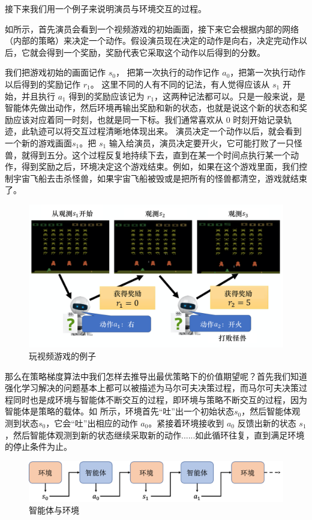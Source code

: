 接下来我们用一个例子来说明演员与环境交互的过程。

如所示，首先演员会看到一个视频游戏的初始画面，接下来它会根据内部的网络（内部的策略）来决定一个动作。假设演员现在决定的动作是向右，决定完动作以后，它就会得到一个奖励，奖励代表它采取这个动作以后得到的分数。

我们把游戏初始的画面记作 $s_0$， 把第一次执行的动作记作 $a_0$，把第一次执行动作以后得到的奖励记作 $r_1$。
这里不同的人有不同的记法，有人觉得应该从 $s_1$ 开始，并且执行 $a_1$ 得到的奖励应该记为 $r_1$，这两种记法都可以。只是一般来说，是智能体先做出动作，然后环境再输出奖励和新的状态，也就是说这个新的状态和奖励应该对应着同一时刻，也就是同一下标。我们通常喜欢从 0 时刻开始记录轨迹，此轨迹可以将交互过程清晰地体现出来。
演员决定一个动作以后，就会看到一个新的游戏画面$s_1$。把 $s_1$ 输入给演员，演员决定要开火，它可能打败了一只怪兽，就得到五分。这个过程反复地持续下去，直到在某一个时间点执行某一个动作，得到奖励之后，环境决定这个游戏结束。例如，如果在这个游戏里面，我们控制宇宙飞船去击杀怪兽，如果宇宙飞船被毁或是把所有的怪兽都清空，游戏就结束了。

\begin{figure}[hbt]
    \centering
    \includegraphics[width=0.5\linewidth]{ch6/figs/example_play_game.png}
    \caption{玩视频游戏的例子}
    \label{fig:example_play_game}
\end{figure}


那么在策略梯度算法中我们怎样去推导出最优策略下的价值期望呢？首先我们知道强化学习解决的问题基本上都可以被描述为马尔可夫决策过程，而马尔可夫决策过程同时也是成环境与智能体不断交互的过程，即环境与策略不断交互的过程，因为智能体是策略的载体。如 所示，环境首先“吐”出一个初始状态$s_0$，然后智能体观测到状态$s_0$，它会“吐”出相应的动作 $a_0$。紧接着环境接收到 $a_0$ 反馈出新的状态 $s_1$，然后智能体观测到新的状态继续采取新的动作......如此循环往复，直到满足环境的停止条件为止。

\begin{figure}[hbt]
    \centering
    \includegraphics[width=0.5\linewidth]{ch6/figs/env_agent.png}
    \caption{智能体与环境}
    \label{fig:env_agent}
\end{figure}

